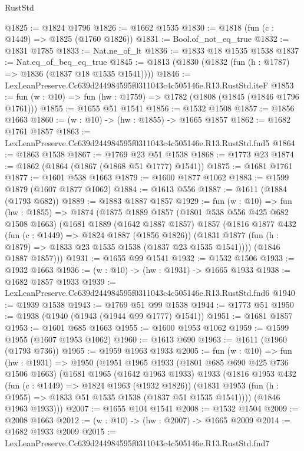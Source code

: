 \begin{lexlean}{RustStd}
\begin{coremodule}
@1825 := @1824 @1796
@1826 := @1662 @1535
@1830 := @1818 (fun (c : @1449) => @1825 (@1760 @1826))
@1831 := Bool.of_not_eq_true
@1832 := @1831 @1785
@1833 := Nat.ne_of_lt
@1836 := @1833 @18 @1535 @1538
@1837 := Nat.eq_of_beq_eq_true
@1845 := @1813 (@1830 (@1832 (fun (h : @1787) => @1836 (@1837 @18 @1535 @1541))))
@1846 := LexLeanPreserve.Cc639d244984595f0311043c4c505146e.R13.RustStd.iteF
@1853 := fun (w : @10) => fun (hw : @1759) => @1782 (@1808 (@1845 (@1846 @1796 @1761)))
@1855 := @1655 @51 @1541
@1856 := @1532 @1508
@1857 := @1856 @1663
@1860 := (w : @10) -> (hw : @1855) -> @1665 @1857
@1862 := @1682 @1761 @1857
@1863 := LexLeanPreserve.Cc639d244984595f0311043c4c505146e.R13.RustStd.fnd5
@1864 := @1863 @1538
@1867 := @1769 @23 @51 @1538
@1868 := @1773 @23
@1874 := @1862 (@1864 (@1867 (@1868 @51 @1777) @1541))
@1875 := @1681 @1761
@1877 := @1601 @538 @1663
@1879 := @1600 @1877 @1062
@1883 := @1599 @1879 (@1607 @1877 @1062)
@1884 := @1613 @556
@1887 := @1611 (@1884 (@1793 @682))
@1889 := @1883 @1887 @1857
@1929 := fun (w : @10) =>
  fun (hw : @1855) =>
  @1874
    (@1875
      @1889
      @1857
      (@1801 @538 @556 @425 @682 @1508 @1663)
      (@1681
        @1889
        (@1642 @1887 @1857)
        @1857
        (@1816
          @1877
          @432
          (fun (c : @1449) => @1824 @1887 (@1856 @1826))
          (@1831 @1877 (fun (h : @1879) => @1833 @23 @1535 @1538 (@1837 @23 @1535 @1541))))
        (@1846 @1887 @1857)))
@1931 := @1655 @99 @1541
@1932 := @1532 @1506
@1933 := @1932 @1663
@1936 := (w : @10) -> (hw : @1931) -> @1665 @1933
@1938 := @1682 @1857 @1933
@1939 := LexLeanPreserve.Cc639d244984595f0311043c4c505146e.R13.RustStd.fnd6
@1940 := @1939 @1538
@1943 := @1769 @51 @99 @1538
@1944 := @1773 @51
@1950 := @1938 (@1940 (@1943 (@1944 @99 @1777) @1541))
@1951 := @1681 @1857
@1953 := @1601 @685 @1663
@1955 := @1600 @1953 @1062
@1959 := @1599 @1955 (@1607 @1953 @1062)
@1960 := @1613 @690
@1963 := @1611 (@1960 (@1793 @736))
@1965 := @1959 @1963 @1933
@2005 := fun (w : @10) =>
  fun (hw : @1931) =>
  @1950
    (@1951
      @1965
      @1933
      (@1801 @685 @690 @425 @736 @1506 @1663)
      (@1681
        @1965
        (@1642 @1963 @1933)
        @1933
        (@1816
          @1953
          @432
          (fun (c : @1449) => @1824 @1963 (@1932 @1826))
          (@1831 @1953 (fun (h : @1955) => @1833 @51 @1535 @1538 (@1837 @51 @1535 @1541))))
        (@1846 @1963 @1933)))
@2007 := @1655 @104 @1541
@2008 := @1532 @1504
@2009 := @2008 @1663
@2012 := (w : @10) -> (hw : @2007) -> @1665 @2009
@2014 := @1682 @1933 @2009
@2015 := LexLeanPreserve.Cc639d244984595f0311043c4c505146e.R13.RustStd.fnd7

\end{coremodule}
\end{lexlean}
